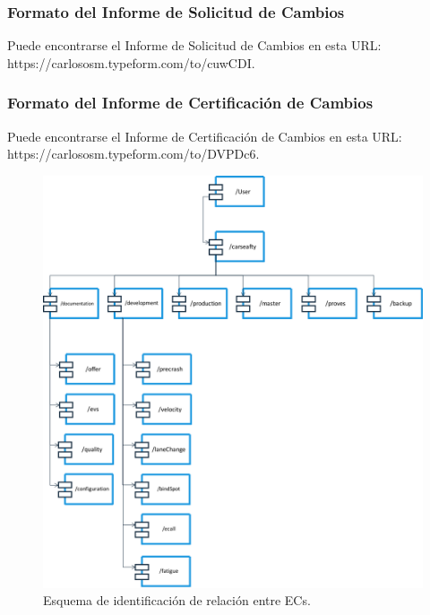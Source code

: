 \subsubsection{Formato del Informe de Solicitud de Cambios}\label{inf:ISC}
Puede encontrarse el Informe de Solicitud de Cambios en esta URL: https://carlososm.typeform.com/to/cuwCDI.
\subsubsection{Formato del Informe de Certificación de Cambios}
Puede encontrarse el Informe de Certificación de Cambios en esta URL: https://carlososm.typeform.com/to/DVPDc6.


\begin{figure}[hb]
\begin{center}
\includegraphics[width=1\textwidth]{./img/softwareLibrary}
\end{center}
\caption{Esquema de identificación de relación entre ECs.}
\label{img:softwareLibrary}
\end{figure}
